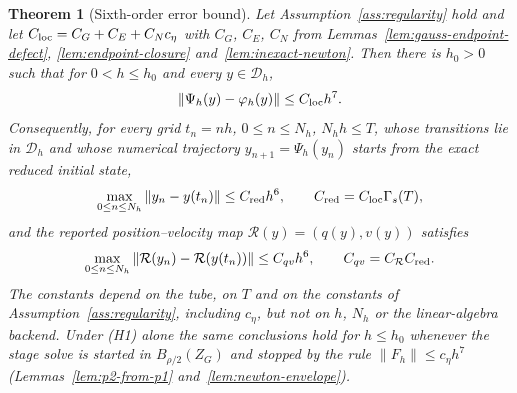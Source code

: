 \documentclass[preprint,12pt]{elsarticle}
\newtheorem{theorem}{Theorem}
\begin{document}
\begin{theorem}[Sixth-order error bound]
\label{thm:g6fullva-order}
Let Assumption~\ref{ass:regularity} hold and let $C_{\rm loc}=C_G+C_E+C_Nc_\eta$ with $C_G$, $C_E$,
$C_N$ from Lemmas~\ref{lem:gauss-endpoint-defect}, \ref{lem:endpoint-closure}
and~\ref{lem:inexact-newton}. Then there is $h_0>0$ such that for $0<h\le h_0$ and every
$y\in\mathcal D_h$,
\begin{equation}
\label{eq:g6fva-local-defect-theorem}
  \|\Psi_h(y)-\varphi_h(y)\|\le C_{\rm loc}h^7 .
\end{equation}
Consequently, for every grid $t_n=nh$, $0\le n\le N_h$, $N_hh\le T$, whose transitions lie in
$\mathcal D_h$ and whose numerical trajectory $y_{n+1}=\Psi_h(y_n)$ starts from the exact reduced
initial state,
\begin{equation}
\label{eq:g6fva-reduced-grid-bound}
  \max_{0\le n\le N_h}\|y_n-y(t_n)\|\le C_{\rm red}h^6,\qquad C_{\rm red}=C_{\rm loc}\Gamma_s(T),
\end{equation}
and the reported position--velocity map $\mathcal R(y)=(q(y),v(y))$ satisfies
\begin{equation}
\label{eq:g6fva-reported-grid-bound}
  \max_{0\le n\le N_h}\|\mathcal R(y_n)-\mathcal R(y(t_n))\|\le C_{qv}h^6,\qquad
  C_{qv}=C_{\mathcal R}C_{\rm red} .
\end{equation}
The constants depend on the tube, on $T$ and on the constants of Assumption~\ref{ass:regularity},
including $c_\eta$, but not on $h$, $N_h$ or the linear-algebra backend. Under (H1) alone the same
conclusions hold for $h\le h_0$ whenever the stage solve is started in $B_{\rho/2}(Z_G)$ and
stopped by the rule $\|F_h\|\le c_\eta h^7$ (Lemmas~\ref{lem:p2-from-p1}
and~\ref{lem:newton-envelope}).
\end{theorem}
\end{document}
